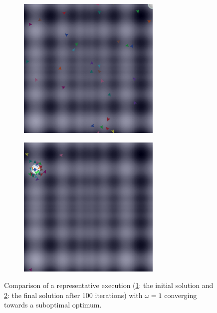 \documentclass[12pt]{article}
\begin{document}
\begin{figure}[h!]
\begin{subfigure}[c]{0.5\textwidth}
\centering
\includegraphics[width=0.75\textwidth]{figures/ex3/wrong-optimum-init.png}
\label{fig:ex3-example-a}
\end{subfigure}
\begin{subfigure}[c]{0.5\textwidth}
\centering
\includegraphics[width=0.75\textwidth]{figures/ex3/wrong-optimum.png}
\label{fig:ex3-example-b}
\end{subfigure}

\caption{Comparison of a representative execution (\ref{fig:ex3-example-a}: the initial solution and \ref{fig:ex3-example-b}: the final solution after 100 iterations) with $\omega=1$ converging towards a suboptimal optimum.}
\label{fig:ex3-example}

\end{figure}
\end{document}
